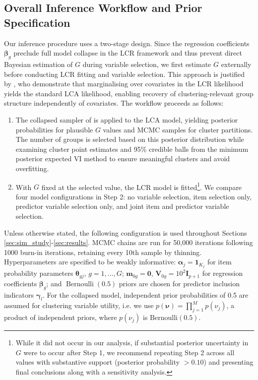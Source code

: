 \documentclass[11pt]{article}
\def\Bern{\operatorname{Bernoulli}}
\def\boldm{\mathbf{m}}
\def\boldI{\mathbf{I}}
\def\boldV{\mathbf{V}}
\def\bsal{\boldsymbol{\alpha}}
\def\bsbet{\boldsymbol{\beta}}
\def\bsgam{\boldsymbol{\gamma}}
\def\bsthet{\boldsymbol{\theta}}
\def\bsnu{\boldsymbol{\nu}}
\theoremstyle{plain}
\theoremstyle{definition}
\begin{document}
\subsection{Overall Inference Workflow and Prior Specification}\label{subsec:inferenceworkflow}
Our inference procedure uses a two-stage design. Since the regression coefficients $\bsbet_g$ preclude full model collapse in the LCR framework and thus prevent direct Bayesian estimation of $G$ during variable selection, we first estimate $G$ externally before conducting LCR fitting and variable selection. This approach is justified by \citet{bandeen-roche_latent_1997}, who demonstrate that  marginalising over covariates in the LCR likelihood yields the standard LCA likelihood, enabling recovery of clustering-relevant group structure independently of covariates. The workflow proceeds as follows: 
\begin{enumerate}
    \item The collapsed sampler of \citet{white_bayesian_2016} is applied to the LCA model, yielding posterior probabilities for plausible $G$ values and MCMC samples for cluster partitions. The number of groups is selected based on this posterior distribution while examining cluster point estimates and 95\% credible balls from the minimum posterior expected VI method to ensure meaningful clusters and avoid overfitting.
    \item With $G$ fixed at the selected value, the LCR model is fitted\footnote{While it did not occur in our analysis, if substantial posterior uncertainty in $G$ were to occur after Step 1, we recommend repeating Step 2 across all values with substantive support (posterior probability $> 0.10$) and presenting final conclusions along with a sensitivity analysis.}. We compare four model configurations in Step 2: no variable selection, item selection only, predictor variable selection only, and joint item and predictor variable selection. 
\end{enumerate}
Unless otherwise stated, the following configuration is used throughout Sections \ref{sec:sim_study}-\ref{sec:results}. MCMC chains are run for 50,000 iterations following 1000 burn-in iterations, retaining every 10th sample by thinning. Hyperparameters are specified to be weakly informative: $\bsal_j = \mathbf{1}_{K_j}$ for item probability parameters $\bsthet_{gj}$, $g = 1,\dots,G$; $\boldm_{0g} = \mathbf{0}$, $\boldV_{0g} = 10^2\boldI_{p+1}$ for regression coefficients $\bsbet_g$; and $\Bern(0.5)$ priors are chosen for predictor inclusion indicators $\bsgam_l$. For the collapsed model, independent prior probabilities of 0.5 are assumed for clustering variable utility, i.e. we use $p(\bsnu) = \prod_{j=1}^M p(\nu_j)$, a product of independent priors, where $p(\nu_j)$ is $\mathrm{Bernoulli}(0.5)$.
\end{document}
